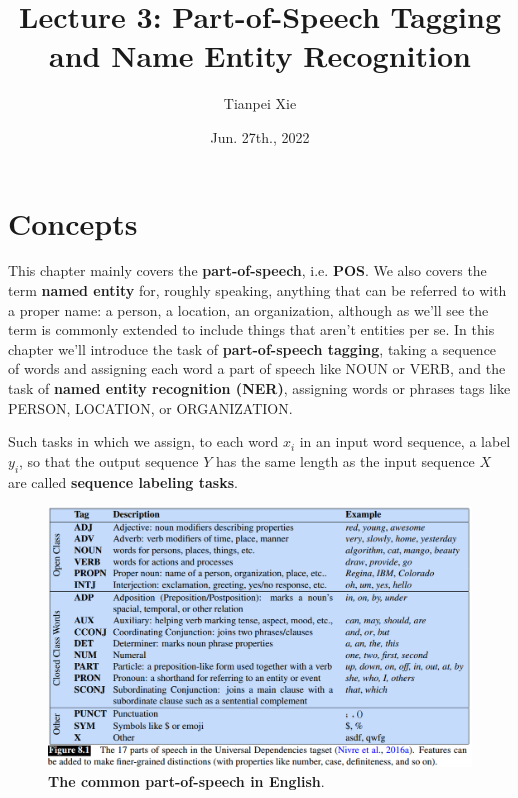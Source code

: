\documentclass[11pt]{article}
\begin{document}
\title{Lecture 3: Part-of-Speech Tagging and Name Entity Recognition}
\author{ Tianpei Xie}
\date{ Jun. 27th., 2022 }
\maketitle
\tableofcontents
\newpage
\allowdisplaybreaks
\section{Concepts}
This chapter mainly covers the \textbf{part-of-speech}, i.e. \textbf{POS}. We also covers the term \textbf{named entity} for, roughly speaking, anything that can be referred to with a proper name: a person, a location, an organization, although as we’ll see the term is commonly extended to include things that aren’t entities per se. In this chapter we’ll introduce the task of \textbf{part-of-speech tagging}, taking a sequence of words and assigning each word a part of speech like NOUN or VERB, and
the task of \textbf{named entity recognition (NER)}, assigning words or phrases tags like PERSON, LOCATION, or ORGANIZATION. 

Such tasks in which we assign, to each word $x_i$ in an input word sequence, a label $y_i$, so that the output sequence $Y$ has the same length as the input sequence $X$
are called \textbf{sequence labeling tasks}. 

\begin{figure}
\begin{minipage}[t]{1\linewidth}
  \centering
  \centerline{\includegraphics[scale = 0.4]{pos.png}}
\end{minipage}
\caption{\footnotesize{\textbf{The common part-of-speech in English}.}}
\label{fig: pos}
\end{figure}
\end{document}
